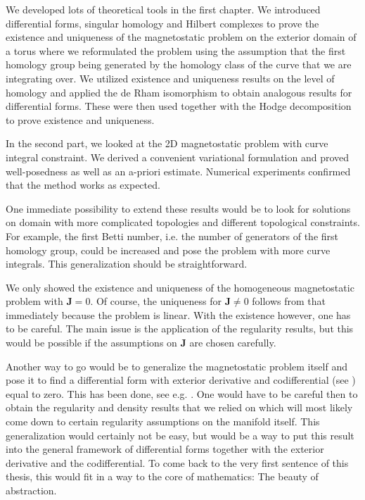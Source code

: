 \documentclass[../master_thesis.tex]{subfiles}
\begin{document}
We developed lots of theoretical tools in the first chapter. We introduced 
differential forms, singular homology and Hilbert complexes 
to prove the existence and uniqueness of the magnetostatic 
problem on the exterior domain of a torus where we reformulated the problem 
using the assumption that the first homology group being generated by the homology class 
of the curve that we are integrating over. We utilized existence and uniqueness results 
on the level of homology and applied the de Rham isomorphism to obtain analogous 
results for differential forms. These were then used together with the Hodge 
decomposition to prove existence and uniqueness.

In the second part, we looked at the 2D magnetostatic problem with curve integral 
constraint. We derived a convenient variational formulation and 
proved well-posedness as well as an a-priori estimate. Numerical experiments 
confirmed that the method works as expected.

One immediate possibility to extend these results would be to look for solutions on domain with more complicated 
topologies and different topological constraints. For example, the first Betti number, 
i.e. the number of generators of the first homology group, could be increased
and pose the problem with more curve integrals. This generalization should be 
straightforward. 

We only showed the existence and uniqueness of the homogeneous magnetostatic problem 
with $\mathbf{J}=0$. Of course, the uniqueness for $\mathbf{J} \neq 0$ follows from 
that immediately because the problem is linear. With the existence however, 
one has to be careful. The main issue is the application of the regularity results, but 
this would be possible if the assumptions on $\mathbf{J}$ are chosen carefully.

Another way to go would be to generalize the magnetostatic problem itself 
and pose it to find a differential form with exterior derivative and codifferential 
(see \cite[Sec.\,6.2.6]{arnold})
equal to zero. This has been done, see e.g. \cite[Chap.\,3]{schwarz}.
One would have to be careful 
then to obtain the regularity and density results that we relied on which 
will most likely come down to certain regularity assumptions on the manifold itself.
This generalization would certainly not be easy, but would be a way to put 
this result into the general framework of differential forms together with 
the exterior derivative and the codifferential. To come back to the very
first sentence of this thesis, this would fit in a way to the core of 
mathematics: The beauty of abstraction.
\end{document}
